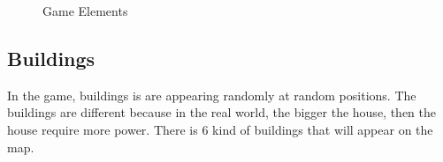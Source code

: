     \begin{figure}[!ht]
    \centering
    \caption{Game Elements}
    \end{figure}


\subsection*{Buildings}
    In the game, buildings is are appearing randomly at random positions. The buildings are different
    because in the real world, the bigger the house, then the house require more power. There is 6 kind
    of buildings that will appear on the map. 


